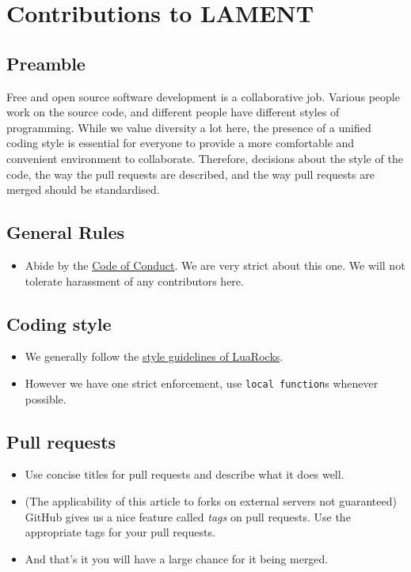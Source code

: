 \section{Contributions to LAMENT}\label{contributions-to-lament}

\subsection{Preamble}\label{preamble}

Free and open source software development is a collaborative job.
Various people work on the source code, and different people have
different styles of programming. While we value diversity a lot here,
the presence of a unified coding style is essential for everyone to
provide a more comfortable and convenient environment to collaborate.
Therefore, decisions about the style of the code, the way the pull
requests are described, and the way pull requests are merged should be
standardised.

\subsection{General Rules}\label{general-rules}

\begin{itemize}
\item
  Abide by the \href{CODE_OF_CONDUCT.md}{Code of Conduct}. We are very
  strict about this one. We will not tolerate harassment of any
  contributors here.
\end{itemize}

\subsection{Coding style}\label{coding-style}

\begin{itemize}
\item
  We generally follow the
  \href{https://github.com/luarocks/lua-style-guide}{style guidelines of LuaRocks}.
\item
  However we have one strict enforcement, use \texttt{local\ function}s
  whenever possible.
\end{itemize}

\subsection{Pull requests}\label{pull-requests}

\begin{itemize}
\item
  Use concise titles for pull requests and describe what it does well.
\item
  (The applicability of this article to forks on external servers not
  guaranteed) GitHub gives us a nice feature called \emph{tags} on pull
  requests. Use the appropriate tags for your pull requests.
\item
  And that's it you will have a large chance for it being merged.
\end{itemize}

